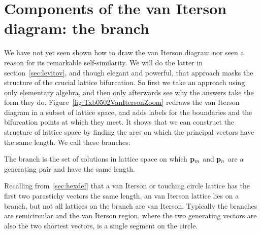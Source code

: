 \section{Components of the van Iterson diagram: the  branch}
\label{sec:mequalsn}
We have not yet seen shown how to draw the van Iterson diagram nor seen a reason for its remarkable self-similarity. We will do the latter in section~\ref{sec:levitov}, and though elegant and powerful, that approach masks the structure of the crucial lattice bifurcation.  So first we take an approach using only elementary algebra, and then only afterwards see why the answers take the form they do. 
Figure~\ref{fig:Txb0502VanItersonZoom} redraws 
the van Iterson diagram in a subset of lattice space, and adds labels for the boundaries and the bifurcation points at which they meet. 
%
It shows that we can construct the structure of lattice space by finding the arcs on which  the principal vectors have the same length. We call these branches: 
\begin{definition}
The branch   is the set of solutions in lattice space on which ${\mathbf p}_{m}$ and ${\mathbf p}_{n}$ are a generating pair and have the same length.

\end{definition}
Recalling from~\ref{sec:hexdef} that a van Iterson or touching circle lattice has the first two parastichy vectors the same length, an  van Iterson lattice 
 lies on a  branch, but not all lattices on the branch are van Iterson.   Typically the branches are semicircular and the van Iterson region, where the two generating vectors are also the two shortest vectors, is a single segment on the circle. 


